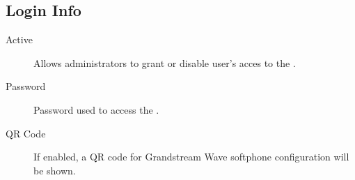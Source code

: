 \documentclass[letterpaper,10pt,english]{sphinxmanual}
\begin{document}
\subsection{Login Info}
\label{pbx_features/users:login-info}
\noindent{}
\begin{description}
\item[{Active}] \leavevmode{}\label{pbx_features/users:term-active}
Allows administrators to grant or disable user's acces to the
{\hyperref[userportal/index:userportal]{}}.

\item[{Password}] \leavevmode{}\label{pbx_features/users:term-password}
Password used to access the {\hyperref[userportal/index:userportal]{}}.

\item[{QR Code}] \leavevmode{}\label{pbx_features/users:term-qr-code}
If enabled, a QR code for Grandstream Wave softphone configuration
will be shown.

\end{description}
\end{document}
